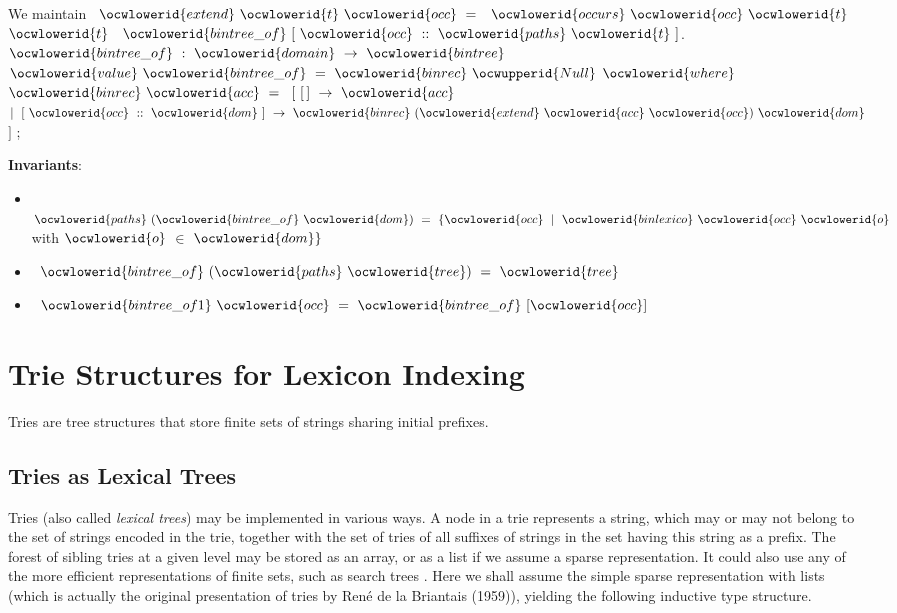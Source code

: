 \documentclass[12pt]{article}
\begin{document}
\ocwendcode{}\ocwindent{0.00em}
We maintain \ocwbegindcode{}~$\ocwlowerid{extend}~\ocwlowerid{t}~\ocwlowerid{occ}~=~$~$\ocwlowerid{occurs}~\ocwlowerid{occ}~\ocwlowerid{t}~$~$\ocwlowerid{t}
~$~$\ocwlowerid{bintree\_of}~[~\ocwlowerid{occ}~::~\ocwlowerid{paths}~\ocwlowerid{t}~]$\ocwenddcode{}. 
\ocweol
\ocwindent{0.00em}
\ocwbegindcode{}$\ocwlowerid{bintree\_of}~:~\ocwlowerid{domain}~\rightarrow{}~\ocwlowerid{bintree}$\ocwenddcode{} 
\ocweol
\label{../ML/bintree.ml:2794}%
\medskip
\ocwbegincode{}\ocwindent{0.00em}
$\ocwlowerid{value}~\ocwlowerid{bintree\_of}~=~\ocwlowerid{binrec}~\ocwupperid{Null}$\ocweol
\ocwindent{1.00em}
$\ocwlowerid{where}~$~$\ocwlowerid{binrec}~\ocwlowerid{acc}~=~$\ocweol
\ocwindent{1.00em}
$[~[\,]~\rightarrow{}~\ocwlowerid{acc}$\ocweol
\ocwindent{1.00em}
$\mid{}~[~\ocwlowerid{occ}~::~\ocwlowerid{dom}~]~\rightarrow{}~\ocwlowerid{binrec}~(\ocwlowerid{extend}~\ocwlowerid{acc}~\ocwlowerid{occ})~\ocwlowerid{dom}$\ocweol
\ocwindent{1.00em}
$]$\ocweol
\ocwindent{0.00em}
;\medskip

\ocwendcode{}\ocwindent{0.00em}
{\bf Invariants}: 
\begin{itemize}
\item{\ocwbegindcode{}~$\ocwlowerid{paths}~(\ocwlowerid{bintree\_of}~\ocwlowerid{dom})~=~\{\ocwlowerid{occ}~\mid{}~\ocwlowerid{binlexico}~\ocwlowerid{occ}~\ocwlowerid{o}$\ocwenddcode{} with \ocwbegindcode{}$\ocwlowerid{o}$\ocwenddcode{} $\in$ \ocwbegindcode{}$\ocwlowerid{dom}\}$\ocwenddcode{}}
\item{\ocwbegindcode{}~$\ocwlowerid{bintree\_of}~(\ocwlowerid{paths}~\ocwlowerid{tree})~=~\ocwlowerid{tree}~$\ocwenddcode{}}
\item{\ocwbegindcode{}~$\ocwlowerid{bintree\_of1}~\ocwlowerid{occ}~=~\ocwlowerid{bintree\_of}~[\ocwlowerid{occ}]~$\ocwenddcode{}}
\end{itemize} 
\ocweol
\section{Trie Structures for Lexicon Indexing}

Tries are tree structures that store finite sets of strings sharing
initial prefixes. 

\subsection{Tries as Lexical Trees}

Tries (also called {\sl lexical trees})
may be implemented in various ways. A node in a trie represents a
string, which may or may not belong to the set of strings encoded in the
trie, together
with the set of tries of all suffixes of strings in the set having this 
string as a prefix. The forest of sibling tries at a given level 
may be stored as an array, or as a list if we assume a sparse representation. 
It could also use any of the more efficient representations of finite sets,
such as search trees \cite{bentley}.
Here we shall assume the simple sparse representation with 
lists (which is actually the original presentation of tries
by Ren\'e de la Briantais (1959)), 
yielding the following inductive type structure.
\end{document}

